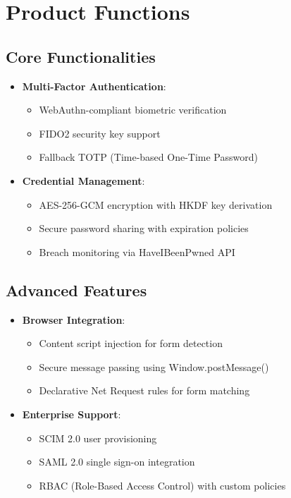 \documentclass{scrreprt}
\begin{document}
\section{Product Functions}
\label{sec:product-functions}

\subsection{Core Functionalities}
\begin{itemize}
    \item \textbf{Multi-Factor Authentication}:
    \begin{itemize}
        \item WebAuthn-compliant biometric verification
        \item FIDO2 security key support
        \item Fallback TOTP (Time-based One-Time Password)
    \end{itemize}
    
    \item \textbf{Credential Management}:
    \begin{itemize}
        \item AES-256-GCM encryption with HKDF key derivation
        \item Secure password sharing with expiration policies
        \item Breach monitoring via HaveIBeenPwned API
    \end{itemize}
\end{itemize}

\subsection{Advanced Features}
\begin{itemize}
    \item \textbf{Browser Integration}:
    \begin{itemize}
        \item Content script injection for form detection
        \item Secure message passing using Window.postMessage()
        \item Declarative Net Request rules for form matching
    \end{itemize}
    
    \item \textbf{Enterprise Support}:
    \begin{itemize}
        \item SCIM 2.0 user provisioning
        \item SAML 2.0 single sign-on integration
        \item RBAC (Role-Based Access Control) with custom policies
    \end{itemize}
\end{itemize}
\end{document}
